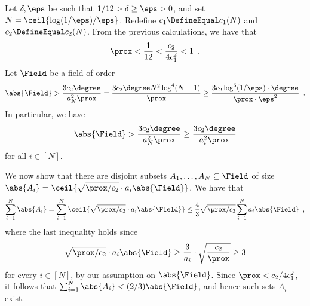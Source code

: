 \documentclass{toc}
\theoremstyle{plain}
\begin{document}
Let $\delta, \eps$ be such that ${1}/{12} > \delta \geq \eps > 0$, and set $N = \ceil{{\log(1/\eps)}/{\eps}}$. Redefine $c_1 \DefineEqual c_1(N)$ and $c_2  \DefineEqual c_2(N)$. {}From the previous calculations, we have that
\[
  \prox < \frac{1}{12} < \frac{c_2}{4 c_1^2} < 1\enspace.
\]
Let $\Field$ be a field of
%
order  %
\[
  \abs{\Field} > \frac{3 c_2 \degree}{a_N^2\prox} = \frac{3 c_2 \degree N^2 \log^4(N+1)}{\prox} \geq  \frac{3 c_2 \log^6(1/\eps) \cdot \degree}{\prox \cdot \eps^2}\enspace.
\]
In particular, we have
\[
  \abs{\Field} > \frac{3 c_2 \degree}{a_N^2\prox} \geq \frac{3 c_2 \degree}{a_i^2\prox}
\]
for all $i \in [N]$.

We now show that there are disjoint subsets $A_1, \dots, A_N \subseteq \Field$ of size $\abs{A_i} = \ceil{\sqrt{\prox/c_2} \cdot a_i \abs{\Field}}$. We have that
\begin{equation*}
        \sum_{i=1}^N \abs{A_i}
        = \sum_{i=1}^N  \ceil{\sqrt{\prox/c_2} \cdot a_i \abs{\Field}}
        \leq \frac{4}{3} \sqrt{\prox/c_2} \sum_{i=1}^N  a_i \abs{\Field}
        \enspace,
    \end{equation*}
    where the last inequality holds since
    \[
      \sqrt{\prox/c_2} \cdot a_i \abs{\Field} \geq \frac{3}{a_i} \cdot \sqrt{\frac{c_2}{\prox}} \geq 3
    \]
    for every $i \in [N]$, by our assumption on $\abs{\Field}$. Since $\prox < c_2 / 4c_1^2$, it follows that $\sum_{i=1}^N \abs{A_i} < ({2}/{3})\abs{\Field}$, and hence
%
%
%
such sets $A_i$ exist.                  %
\end{document}
